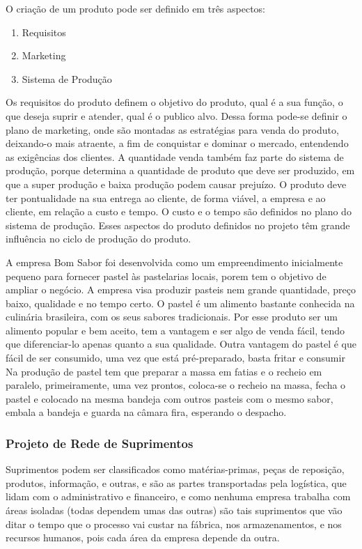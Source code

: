 O criação de um produto pode ser definido em três aspectos:

\begin{enumerate}
\item Requisitos
\item Marketing
\item Sistema de Produção
\end{enumerate}

Os requisitos do produto definem o objetivo do produto, qual é a sua função, o que deseja suprir e atender, qual é o publico alvo. Dessa forma pode-se definir o plano de marketing, onde são montadas as estratégias para venda do produto, deixando-o mais atraente, a fim de conquistar e dominar o mercado, entendendo as exigências dos clientes. A quantidade venda também faz parte do  sistema de produção, porque determina a quantidade de produto que deve ser produzido, em que a super produção e baixa produção podem causar prejuízo.  O produto deve ter pontualidade na sua entrega ao cliente, de forma viável, a empresa e ao cliente, em relação a custo e tempo.  O custo e o tempo são definidos no plano do sistema de produção. Esses aspectos do produto definidos no projeto têm grande influência no ciclo de produção do produto.

A empresa Bom Sabor foi desenvolvida como um empreendimento inicialmente pequeno para fornecer pastel às pastelarias locais, porem tem o objetivo de ampliar o negócio. A empresa visa produzir pasteis nem grande quantidade, preço baixo, qualidade e no tempo certo.
O pastel é um alimento bastante conhecida na culinária brasileira, com os seus sabores tradicionais. Por esse produto ser um alimento popular e bem aceito, tem a vantagem e ser algo de venda fácil, tendo que diferenciar-lo apenas quanto a sua qualidade.  Outra vantagem do pastel é que fácil de ser consumido, uma vez que está pré-preparado, basta fritar e consumir
Na produção de pastel tem que preparar a massa em fatias e o recheio em paralelo, primeiramente, uma vez prontos, coloca-se o recheio na massa, fecha o pastel e colocado na mesma bandeja com outros pasteis com o mesmo sabor, embala a bandeja e guarda na câmara fira, esperando o despacho.

\subsubsection{Projeto de Rede de Suprimentos}

Suprimentos podem ser classificados como matérias-primas, peças de reposição, produtos, informação, e outras, e são as partes transportadas pela logística, que lidam com o administrativo e financeiro, e como nenhuma empresa trabalha com áreas isoladas (todas dependem umas das outras) são tais suprimentos que vão ditar o tempo que o processo vai custar na fábrica, nos armazenamentos, e nos recursos humanos, pois cada área da empresa depende da outra. 

